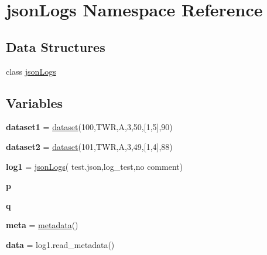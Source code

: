 \hypertarget{namespacejson_logs}{}\section{json\+Logs Namespace Reference}
\label{namespacejson_logs}
\subsection*{Data Structures}
\begin{DoxyCompactItemize}
\item 
class \mbox{\hyperlink{classjson_logs_1_1json_logs}{json\+Logs}}
\end{DoxyCompactItemize}
\subsection*{Variables}
\begin{DoxyCompactItemize}
\item 
\mbox{\label{namespacejson_logs_aa45215aec5051c625bd14c629254cf58}} 
{\bfseries dataset1} = \mbox{\hyperlink{classjson_structures_1_1dataset}{dataset}}(100,\textquotesingle{}T\+WR\textquotesingle{},\textquotesingle{}A\textquotesingle{},\textquotesingle{}3\textquotesingle{},50,\mbox{[}1,5\mbox{]},90)
\item 
\mbox{\label{namespacejson_logs_a409e7d6fddac0e10a323a3fbe2e71e1f}} 
{\bfseries dataset2} = \mbox{\hyperlink{classjson_structures_1_1dataset}{dataset}}(101,\textquotesingle{}T\+WR\textquotesingle{},\textquotesingle{}A\textquotesingle{},\textquotesingle{}3\textquotesingle{},49,\mbox{[}1,4\mbox{]},88)
\item 
\mbox{\label{namespacejson_logs_a7a98b0056c3f582bc848216ace876714}} 
{\bfseries log1} = \mbox{\hyperlink{classjson_logs_1_1json_logs}{json\+Logs}}( \textquotesingle{}test.\+json\textquotesingle{},\textquotesingle{}log\+\_\+test\textquotesingle{},\textquotesingle{}no comment\textquotesingle{})
\item 
\mbox{\label{namespacejson_logs_ac483f6ce851c9ecd9fb835ff7551737c}} 
{\bfseries p}
\item 
\mbox{\label{namespacejson_logs_a099b3b060154898840f0ebdfb46ec78f}} 
{\bfseries q}
\item 
\mbox{\label{namespacejson_logs_a2cb6ac985e5133868af0f75cb0f1edbb}} 
{\bfseries meta} = \mbox{\hyperlink{classjson_structures_1_1metadata}{metadata}}()
\item 
\mbox{\label{namespacejson_logs_a511ae0b1c13f95e5f08f1a0dd3da3d93}} 
{\bfseries data} = log1.\+read\+\_\+metadata()
\end{DoxyCompactItemize}


